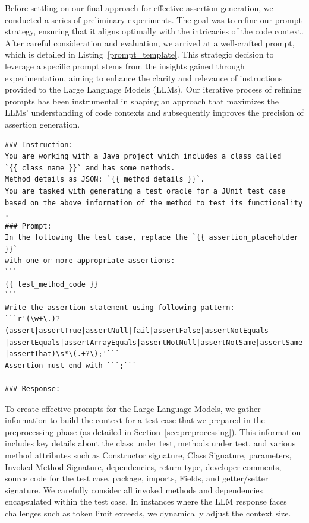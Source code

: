 Before settling on our final approach for effective assertion generation, we conducted a series of preliminary experiments. The goal was to refine our prompt strategy, ensuring that it aligns optimally with the intricacies of the code context. After careful consideration and evaluation, we arrived at a well-crafted prompt, which is detailed in Listing~\ref{prompt_template}. This strategic decision to leverage a specific prompt stems from the insights gained through experimentation, aiming to enhance the clarity and relevance of instructions provided to the Large Language Models (LLMs). Our iterative process of refining prompts has been instrumental in shaping an approach that maximizes the LLMs' understanding of code contexts and subsequently improves the precision of assertion generation.

\begin{lstlisting}[style=llm_prompt, label=prompt_template, caption=Prompt Template]
### Instruction:
You are working with a Java project which includes a class called 
`{{ class_name }}` and has some methods.
Method details as JSON: `{{ method_details }}`.
You are tasked with generating a test oracle for a JUnit test case 
based on the above information of the method to test its functionality .
### Prompt:
In the following the test case, replace the `{{ assertion_placeholder }}` 
with one or more appropriate assertions:
```
{{ test_method_code }}
```
Write the assertion statement using following pattern:
```r'(\w+\.)?(assert|assertTrue|assertNull|fail|assertFalse|assertNotEquals
|assertEquals|assertArrayEquals|assertNotNull|assertNotSame|assertSame
|assertThat)\s*\(.+?\);'```
Assertion must end with ```;```

### Response:
\end{lstlisting}

To create effective prompts for the Large Language Models, we gather information to build the context for a test case that we prepared in the preprocessing phase (as detailed in Section~\ref{sec:preprocessing}). This information includes key details about the class under test, methods under test, and various method attributes such as Constructor signature, Class Signature, parameters, Invoked Method Signature, dependencies, return type, developer comments, source code for the test case, package, imports, Fields, and getter/setter signature. We carefully consider all invoked methods and dependencies encapsulated within the test case. In instances where the LLM response faces challenges such as token limit exceeds, we dynamically adjust the context size.

